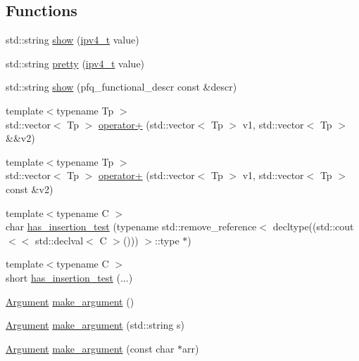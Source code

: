 \subsection*{Functions}
\begin{DoxyCompactItemize}
\item 
std\+::string \hyperlink{namespacepfq_1_1lang_a6b371b706602987f7e45c7558824fa34}{show} (\hyperlink{structpfq_1_1lang_1_1ipv4__t}{ipv4\+\_\+t} value)
\item 
std\+::string \hyperlink{namespacepfq_1_1lang_a7a4c9ec62feae5479366427beeff5b74}{pretty} (\hyperlink{structpfq_1_1lang_1_1ipv4__t}{ipv4\+\_\+t} value)
\item 
std\+::string \hyperlink{namespacepfq_1_1lang_a92d9597c137911206814e93dc0b8a414}{show} (pfq\+\_\+functional\+\_\+descr const \&descr)
\item 
{\footnotesize template$<$typename Tp $>$ }\\std\+::vector$<$ Tp $>$ \hyperlink{namespacepfq_1_1lang_a54f9b99ed2adf6dc2e74d21a38be3bf3}{operator+} (std\+::vector$<$ Tp $>$ v1, std\+::vector$<$ Tp $>$ \&\&v2)
\item 
{\footnotesize template$<$typename Tp $>$ }\\std\+::vector$<$ Tp $>$ \hyperlink{namespacepfq_1_1lang_ae66ee716bfcd7329fbf24620066e48e0}{operator+} (std\+::vector$<$ Tp $>$ v1, std\+::vector$<$ Tp $>$ const \&v2)
\item 
{\footnotesize template$<$typename C $>$ }\\char \hyperlink{namespacepfq_1_1lang_a9af75ca82a20815299b04bb69f1fca34}{has\+\_\+insertion\+\_\+test} (typename std\+::remove\+\_\+reference$<$ decltype((std\+::cout$<$$<$ std\+::declval$<$ C $>$())) $>$\+::type $\ast$)
\item 
{\footnotesize template$<$typename C $>$ }\\short \hyperlink{namespacepfq_1_1lang_af04e27025f4924c0d350098e2810af67}{has\+\_\+insertion\+\_\+test} (...)
\item 
\hyperlink{structpfq_1_1lang_1_1Argument}{Argument} \hyperlink{namespacepfq_1_1lang_a35dc5ee70f8418fa93584d1c00c08fa9}{make\+\_\+argument} ()
\item 
\hyperlink{structpfq_1_1lang_1_1Argument}{Argument} \hyperlink{namespacepfq_1_1lang_adeb6fd10ac0ff87d0fa320eae5c3c0e7}{make\+\_\+argument} (std\+::string s)
\item 
\hyperlink{structpfq_1_1lang_1_1Argument}{Argument} \hyperlink{namespacepfq_1_1lang_aeba8e44a2b64d0ed9242ab7e7b955262}{make\+\_\+argument} (const char $\ast$arr)
$$
\end{DoxyCompactItemize}
